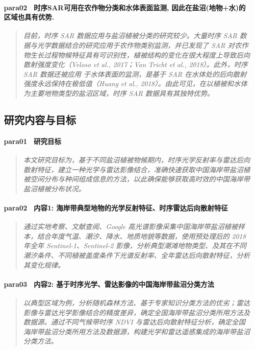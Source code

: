 \paragraph*{para02~
    \textcolor[RGB]{17, 205, 29}{时序SAR可用在农作物分类和水体表面监测, 因此在盐沼(地物+水)的区域也具有优势.}}
\begin{quotation}
    \itshape
    目前，时序 SAR 数据应用与盐沼植被分类的研究较少。大量时序 SAR 数据与光学数据结合的研究应用于农作物类别监测，并已发现了 SAR 对农作物生长过程物候特征具有可识别性，植被结构的变化在很大程度上导致后向散射强度变化（Veloso et al., 2017；Van Tricht et al., 2018）。此外，时序 SAR 数据还被应用
    于水体表面的监测，是基于 SAR 在水体处的后向散射强度永远保持在极低值（Huang et al., 2018）。由此可见，在以植被和水体为主要地物类型的盐沼区域，时序 SAR 数据具有其独特优势。
\end{quotation}

\subsection{研究内容与目标}

\paragraph*{para01~
    \textcolor[RGB]{17, 205, 29}{研究目标}}
\begin{quotation}
    \itshape
    本文研究目标为，基于不同盐沼植被物候期内，时序光学反射率与雷达后向散射特征，建立一种光学与雷达影像结合，准确快速获取中国海岸带盐沼植被空间分布与种间组成信息的方法，以此确保能够获取高时效的中国海岸带盐沼植被分布状况。 
\end{quotation}

\paragraph*{para02~
    \textcolor[RGB]{17, 205, 29}{内容1: 海岸带典型地物的光学反射特征、时序雷达后向散射特征}}
\begin{quotation}
    \itshape
    通过实地考察、文献查阅、Google 高光谱影像采集中国海岸带盐沼植被样本，结合年度气温、潮汐、降水、地质地貌等数据，使用预处理后的 2018 年全年 Sentinel-1、Sentinel-2 影像，分析典型潮滩地物类型、及其在不同潮汐条件、不同植被盖度条件下光谱反射率、全年雷达后向散射特征，分析其变化规律。
\end{quotation}

\paragraph*{para03~
    \textcolor[RGB]{17, 205, 29}{内容2: 基于时序光学、雷达影像的中国海岸带盐沼分类方法 
    }}
\begin{quotation}
    \itshape
    以典型区域为例，分析随机森林方法、基于专家知识分类方法的优劣；雷达影像与雷达光学影像结合的精度差异，确定全国海岸带盐沼分类所用方法及数据源。通过不同气候带时序 NDVI 与雷达后向散射特征分析，确定全国海岸带盐沼分类所用方法及数据源，构建光学和雷达遥感集成的海岸带盐沼分类方法。 
\end{quotation}

